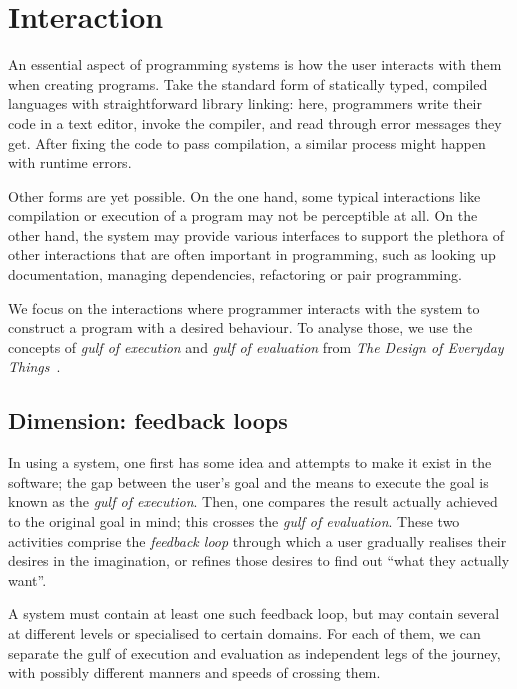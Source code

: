\documentclass[ twoside,openright,titlepage,numbers=noenddot,headinclude,footinclude,cleardoublepage=empty,abstract=on,
                BCOR=5mm,paper=a4,fontsize=11pt
                ]{scrreprt}
\theoremstyle{definition}
\begin{document}


\hypertarget{interaction}{\section{Interaction}\label{interaction}}


An essential aspect of programming systems is how the user interacts
with them when creating programs. Take the standard form of statically
typed, compiled languages with straightforward library linking: here,
programmers write their code in a text editor, invoke the compiler, and
read through error messages they get. After fixing the code to pass
compilation, a similar process might happen with runtime errors.

Other forms are yet possible. On the one hand, some typical interactions
like compilation or execution of a program may not be perceptible at
all. On the other hand, the system may provide various interfaces to
support the plethora of other interactions that are often important in
programming, such as looking up documentation, managing dependencies,
refactoring or pair programming.

We focus on the interactions where programmer interacts with the system
to construct a program with a desired behaviour. To analyse those, we
use the concepts of \emph{gulf of execution} and \emph{gulf of
evaluation} from \emph{The Design of Everyday
Things}~\parencite{Norman}.

\hypertarget{dimension-feedback-loops}{\subsection{Dimension: feedback loops}\label{dimension-feedback-loops}}

In using a system, one first has some idea and attempts to make it exist
in the software; the gap between the user's goal and the means to
execute the goal is known as the \emph{gulf of execution}. Then, one
compares the result actually achieved to the original goal in mind; this
crosses the \emph{gulf of evaluation}. These two activities comprise the
\emph{feedback loop} through which a user gradually realises their
desires in the imagination, or refines those desires to find out ``what
they actually want''.

A system must contain at least one such feedback loop, but may contain
several at different levels or specialised to certain domains. For each
of them, we can separate the gulf of execution and evaluation as
independent legs of the journey, with possibly different manners and
speeds of crossing them.
\end{document}
